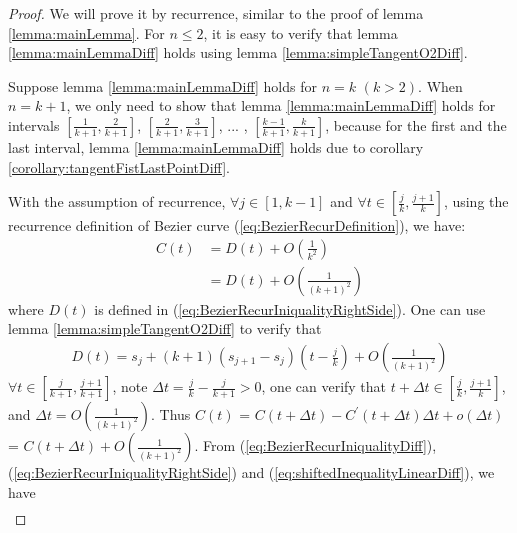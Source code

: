 \begin{proof}
We will prove it by recurrence, similar to the proof of lemma \ref{lemma:mainLemma}. For $n \le 2$, it is easy to verify that lemma \ref{lemma:mainLemmaDiff} holds using lemma \ref{lemma:simpleTangentO2Diff}. 

Suppose lemma \ref{lemma:mainLemmaDiff} holds for $n=k$ $(k > 2)$. When $n=k+1$, we only need to show that lemma \ref{lemma:mainLemmaDiff} holds for intervals $\left[\frac{1}{k+1}, \frac{2}{k+1}\right]$, $\left[\frac{2}{k+1}, \frac{3}{k+1}\right]$, ... , 
$\left[\frac{k-1}{k+1}, \frac{k}{k+1}\right]$, because for the first and the last interval, lemma \ref{lemma:mainLemmaDiff} holds due to corollary \ref{corollary:tangentFistLastPointDiff}.

With the assumption of recurrence, $\forall j \in \left[1, k-1\right]$ and 
$\forall t \in \left[\frac{j}{k}, \frac{j+1}{k}\right]$, using the recurrence definition of Bezier curve (\ref{eq:BezierRecurDefinition}), we have:
{
\setlength\abovedisplayskip{1pt}
\setlength\belowdisplayskip{1pt}
\begin{equation}\begin{split}
C(t) &= D(t) + O(\frac{1}{{k}^{2}}) \\
 &= D(t) + O(\frac{1}{(k+1)^{2}})
\label{eq:BezierRecurIniqualityDiff}
\end{split}\end{equation}
}
where $D(t)$ is defined in (\ref{eq:BezierRecurIniqualityRightSide}). One can use lemma \ref{lemma:simpleTangentO2Diff} to verify that 
{
\setlength\abovedisplayskip{1pt}
\setlength\belowdisplayskip{1pt}
\begin{equation}\begin{split}
D(t) = s_{j}+(k+1)(s_{j+1}-s_{j})(t - \frac{j}{k}) + O(\frac{1}{(k+1)^{2}})
\label{eq:shiftedInequalityLinearDiff}
\end{split}\end{equation}
}
$\forall t \in \left[\frac{j}{k+1}, \frac{j+1}{k+1}\right]$, note $\Delta t = \frac{j}{k} - \frac{j}{k+1} > 0$, one can verify that $t+\Delta t \in \left[\frac{j}{k}, \frac{j+1}{k}\right]$, and $\Delta t = O(\frac{1}{(k+1)^{2}})$. Thus $C(t)$ = $C(t+\Delta t) - C^{\prime}(t+\Delta t)\Delta t + o(\Delta t)$ = $C(t+\Delta t) + O(\frac{1}{(k+1)^{2}})$. From (\ref{eq:BezierRecurIniqualityDiff}), (\ref{eq:BezierRecurIniqualityRightSide}) and (\ref{eq:shiftedInequalityLinearDiff}), we have
{
\setlength\abovedisplayskip{1pt}
\setlength\belowdisplayskip{1pt}
\begin{equation}\begin{split}

\end{split}
\end{equation}}
\end{proof}
